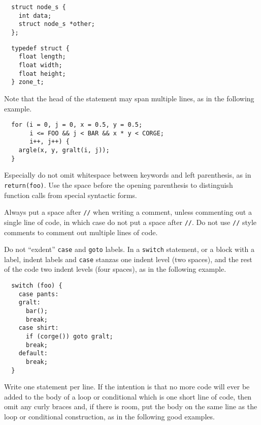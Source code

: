 \documentclass{lulu}
\newcommand{\code}[1]{\texttt{#1}\xspace}
\begin{document}
\begin{samepage}
\begin{verbatim}
  struct node_s {
    int data;
    struct node_s *other;
  };
\end{verbatim}
\end{samepage}

\begin{samepage}
\begin{verbatim}
  typedef struct {
    float length;
    float width;
    float height;
  } zone_t;
\end{verbatim}
\end{samepage}

Note that the head of the statement may span multiple lines, as in the
following example.

\begin{samepage}
\begin{verbatim}
  for (i = 0, j = 0, x = 0.5, y = 0.5; 
       i <= FOO && j < BAR && x * y < CORGE;
       i++, j++) {
    argle(x, y, gralt(i, j));
  }
\end{verbatim}
\end{samepage}

Especially do not omit whitespace between keywords and left
parenthesis, as in \code{return(foo)}.  Use the space before the
opening parenthesis to distinguish function calls from special syntactic
forms.

Always put a space after \code{//} when writing a comment, unless
commenting out a single line of code, in which case do not put a space
after \code{//}.  Do not use \code{//} style comments to comment out
multiple lines of code.

Do not ``exdent'' \code{case} and \code{goto} labels.  In a
\code{switch} statement, or a block with a label, indent labels and
\code{case} stanzas one indent level (two spaces), and the rest of the
code two indent levels (four spaces), as in the following example.

\begin{samepage}
\begin{verbatim}
  switch (foo) {
    case pants:
    gralt:
      bar();
      break;
    case shirt:
      if (corge()) goto gralt;
      break;
    default:
      break;
  }
\end{verbatim}
\end{samepage}

Write one statement per line.  If the intention is that no more code
will ever be added to the body of a loop or conditional which is one
short line of code, then omit any curly braces and, if there is room,
put the body on the same line as the loop or conditional construction,
as in the following good examples.
\end{document}
